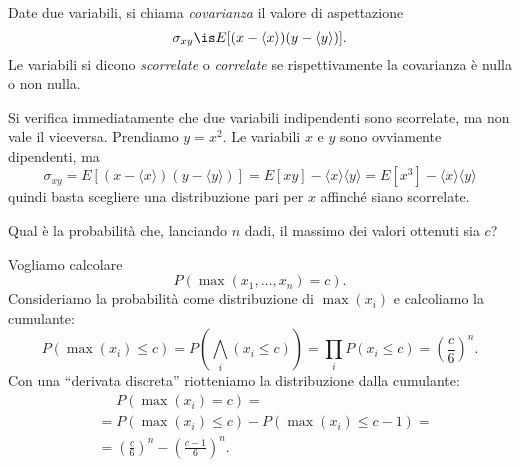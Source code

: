 
\begin{definition}[Covarianza]
	Date due variabili, si chiama \emph{covarianza} il valore di aspettazione
	\begin{equation*}
		\sigma_{xy} \is E[(x-\langle x\rangle)(y-\langle y\rangle)].
	\end{equation*}
	Le variabili si dicono \emph{scorrelate} o \emph{correlate} se rispettivamente la covarianza è nulla o non nulla.
\end{definition}

Si verifica immediatamente che due variabili indipendenti sono scorrelate, ma non vale il viceversa.
Prendiamo $y=x^2$. Le variabili $x$ e $y$ sono ovviamente dipendenti, ma
\begin{equation*}
	\sigma_{xy} = E[(x-\langle x\rangle)(y-\langle y\rangle)] = E[xy] - \langle x\rangle\langle y\rangle = E[x^3] - \langle x\rangle\langle y\rangle
\end{equation*}
quindi basta scegliere una distribuzione pari per $x$ affinché siano scorrelate.

\begin{exercise}
	Qual è la probabilità che, lanciando $n$ dadi, il massimo dei valori ottenuti sia $c$?
\end{exercise}

\begin{solution*}
	Vogliamo calcolare
	\begin{equation*}
		P(\max(x_1,\dots,x_n) = c).
	\end{equation*}
	Consideriamo la probabilità come distribuzione di $\max(x_i)$ e calcoliamo la cumulante:
	\begin{equation*}
		P(\max(x_i) \le c) = P\left(\bigwedge_i(x_i \le c)\right) = \prod_i P(x_i \le c) = \left (\frac c6 \right)^n.
	\end{equation*}
	Con una ``derivata discreta'' riotteniamo la distribuzione dalla cumulante:
	\begin{align*}
		&\phantom{{}={}} P(\max(x_i) = c) = \\
		&= P(\max(x_i) \le c) - P(\max(x_i) \le c-1) = \\
		&= \left (\frac c6 \right)^n - \left (\frac {c-1}6 \right)^n.
	\end{align*}
\end{solution*}

